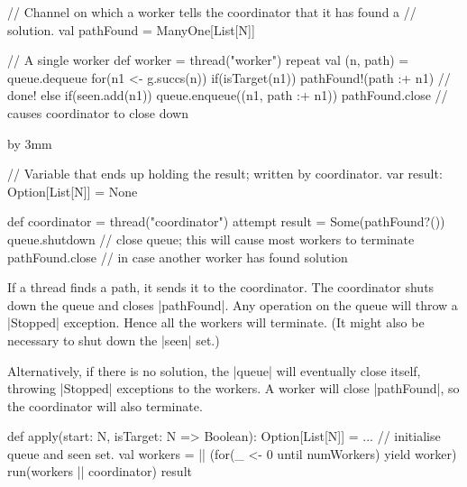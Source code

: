 
\begin{slide}

\begin{scala}
    // Channel on which a worker tells the coordinator that it has found a
    // solution.
    val pathFound = ManyOne[List[N]]

    // A single worker
    def worker = thread("worker"){
      repeat{
        val (n, path) = queue.dequeue
        for(n1 <- g.succs(n)){
          if(isTarget(n1)) pathFound!(path :+ n1) // done!
          else if(seen.add(n1)) queue.enqueue((n1, path :+ n1))
        }
      }
      pathFound.close // causes coordinator to close down
    }
\end{scala}
\end{slide}


{\advance\slideheight by 3mm
\begin{slide}

\begin{scala}
    // Variable that ends up holding the result; written by coordinator. 
    var result: Option[List[N]] = None

    def coordinator = thread("coordinator"){
      attempt{ result = Some(pathFound?()) }{ }
      queue.shutdown // close queue; this will cause most workers to terminate
      pathFound.close // in case another worker has found solution
    }
\end{scala}

If a thread finds a path, it sends it to the coordinator.  The coordinator
shuts down the queue and closes |pathFound|.  Any operation on the queue will
throw a |Stopped| exception.  Hence all the workers will terminate.  (It might
also be necessary to shut down the |seen| set.)

Alternatively, if there is no solution, the |queue| will eventually close
itself, throwing |Stopped| exceptions to the workers.  A worker will close
|pathFound|, so the coordinator will also terminate. 
\end{slide}}


\begin{slide}

\begin{scala}
  def apply(start: N, isTarget: N => Boolean): Option[List[N]] = {
    ... // initialise queue and seen set.
    val workers = || (for(_ <- 0 until numWorkers) yield worker)
    run(workers || coordinator)
    result
  }
\end{scala}
\end{slide}

